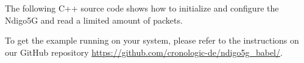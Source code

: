 The following C++ source code shows how to initialize and configure the Ndigo5G and read a limited amount of packets.

To get the example running on your system, please refer to the instructions on our GitHub repository \url{https://github.com/cronologic-de/ndigo5g_babel/}.


